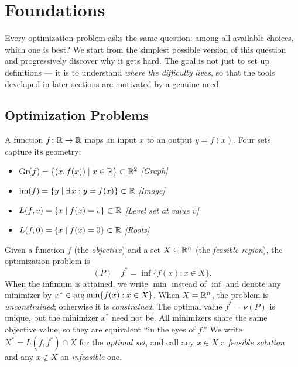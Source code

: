 \section{Foundations}\label{sec:foundations}

Every optimization problem asks the same question: among all available choices, which one is best? We start from the simplest possible version of this question and progressively discover why it gets hard. The goal is not just to set up definitions --- it is to understand \emph{where the difficulty lives}, so that the tools developed in later sections are motivated by a genuine need.

\subsection{Optimization Problems}\label{ssec:opt-problems}

\begin{defn}\label{def:univariate-fn}
	A function $f \colon \mathbb{R} \to \mathbb{R}$ maps an input $x$ to an output $y = f(x)$.
	Four sets capture its geometry:
	\begin{itemize}
		\item $\operatorname{Gr}(f) = \{(x, f(x)) \mid x \in \mathbb{R}\} \subset \mathbb{R}^2$
			\hfill\textit{[Graph]}
		\item $\operatorname{im}(f) = \{y \mid \exists\, x : y = f(x)\} \subset \mathbb{R}$
			\hfill\textit{[Image]}
		\item $L(f, v) = \{x \mid f(x) = v\} \subset \mathbb{R}$
			\hfill\textit{[Level set at value $v$]}
		\item $L(f, 0) = \{x \mid f(x) = 0\} \subset \mathbb{R}$
			\hfill\textit{[Roots]}
	\end{itemize}
\end{defn}

\begin{defn}\label{def:minimization}
	Given a function $f$ (the \textit{objective}) and a set $X \subseteq \mathbb{R}^n$ (the \textit{feasible region}), the optimization problem is
	\begin{equation}\label{eq:opt-problem}
		(P) \quad f^* = \inf\{f(x) : x \in X\}.
	\end{equation}
	When the infimum is attained, we write $\min$ instead of $\inf$ and denote any minimizer by $x^* \in \operatorname*{arg\,min}\{f(x) : x \in X\}$.
	When $X = \mathbb{R}^n$, the problem is \textit{unconstrained}; otherwise it is \textit{constrained}. The optimal value $f^* = \nu(P)$ is unique, but the minimizer $x^*$ need not be. All minimizers share the same objective value, so they are equivalent ``in the eyes of $f$.'' We write $X^* = L(f, f^*) \cap X$ for the \textit{optimal set}, and call any $x \in X$ a \textit{feasible solution} and any $x \notin X$ an \textit{infeasible} one.
\end{defn}

